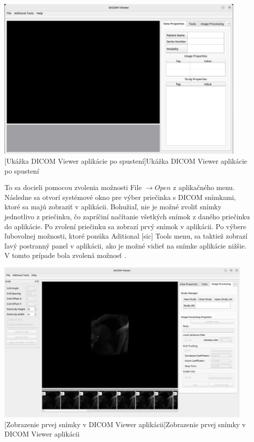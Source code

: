 {\clearpage

\begin {center}
        \centering
        \includegraphics[height=8cm]{media/existing_app/init.png}
        \captionsetup{justification=centering}
        [Ukážka DICOM Viewer aplikácie po spustení]{Ukážka DICOM Viewer aplikácie po spustení}
\end {center}

To sa docieli pomocou zvolenia možnosti File $\rightarrow{ Open}$ z aplikačného menu. Následne sa otvorí systémové okno pre výber priečinka s DICOM snímkami, ktoré sa majú zobraziť v aplikácii. Bohužiaľ, nie je možné zvoliť snímky jednotlivo z priečinku, čo zapríčiní načítanie všetkých snímok z daného priečinku do aplikácie. Po zvolení priečinku sa zobrazí prvý snímok v aplikácii. Po výbere ľubovolnej možnosti, ktoré ponúka Aditional [sic] Tools menu, sa taktiež zobrazí ľavý postranný panel v aplikácii, ako je možné vidieť na snímke aplikácie nižšie. V tomto prípade bola zvolená možnosť .

\begin {center}
        \centering
        \includegraphics[height=8cm]{media/existing_app/app_with_grids_panel.png}
        \captionsetup{justification=centering}
        [Zobrazenie prvej snímky v DICOM Viewer aplikácii]{Zobrazenie prvej snímky v DICOM Viewer aplikácii}
\end {center}

}
